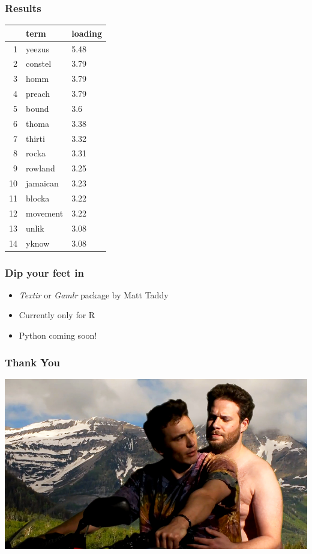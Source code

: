 \documentclass[presentation]{beamer}
\begin{document}
\begin{frame} 	
\frametitle{Results}
\pause
\begin{table}[ht]
\centering
\begin{tabular}{rll}
  \hline
 & term & loading \\ 
  \hline
1 & yeezus & 5.48 \\ 
  2 & constel & 3.79 \\ 
  3 & homm & 3.79 \\ 
  4 & preach & 3.79 \\ 
  5 & bound & 3.6 \\ 
  6 & thoma & 3.38 \\ 
  7 & thirti & 3.32 \\ 
  8 & rocka & 3.31 \\ 
  9 & rowland & 3.25 \\ 
  10 & jamaican & 3.23 \\ 
  11 & blocka & 3.22 \\ 
  12 & movement & 3.22 \\ 
  13 & unlik & 3.08 \\ 
  14 & yknow & 3.08 \\ 
   \hline
\end{tabular}
\end{table}
\end{frame}

\begin{frame}
\frametitle{Dip your feet in}
\pause
\begin{itemize}
\item \textit{Textir} or \textit{Gamlr} package by Matt Taddy
\item Currently only for R
\item Python coming soon!
\end{itemize}
\end{frame}

\begin{frame}
\frametitle{Thank You}
\pause
\begin{center}
\includegraphics[height=1.0\textheight]{Images/rogen.jpg}
\end{center}
\end{frame}
\end{document}
